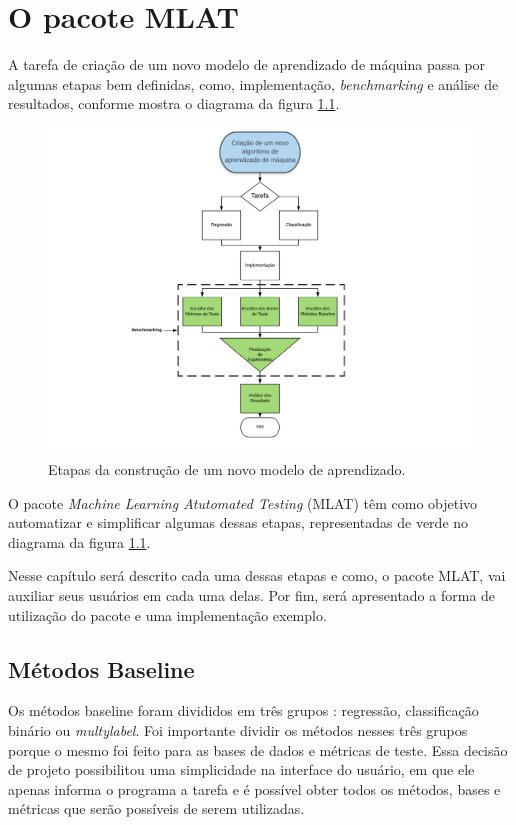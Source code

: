 


\chapter{O pacote MLAT }
\label{chap:TheSoftware}
A tarefa de criação de um novo modelo de aprendizado de máquina passa por algumas etapas bem definidas, como, implementação, \textit{benchmarking} e análise de resultados, conforme mostra o diagrama da figura \ref{fig:BuildingMLModel}.

\begin{figure}[!htb]
	\centering
	\includegraphics[width=\textwidth]{./04-figuras/BuildingNewMethod.png}
	\caption{Etapas da construção de um novo modelo de aprendizado.} 
	\label{fig:BuildingMLModel}
\end{figure}

O pacote \textit{Machine Learning Atutomated Testing} (MLAT) têm como objetivo automatizar e simplificar algumas dessas etapas, representadas de verde no diagrama da figura \ref{fig:BuildingMLModel}. 

Nesse capítulo será descrito cada uma dessas etapas e como, o pacote MLAT, vai auxiliar seus usuários em cada uma delas. Por fim, será apresentado a forma de utilização do pacote e uma implementação exemplo.

\section{Métodos Baseline}
\label{sec:Metodos}
Os métodos baseline foram divididos em três grupos : regressão, classificação binário ou \textit{multylabel}. Foi importante dividir os métodos nesses três grupos porque o mesmo foi feito para as bases de dados e métricas de teste. Essa decisão de projeto possibilitou uma simplicidade na interface do usuário, em que ele apenas informa o programa a tarefa e é possível obter todos os métodos, bases e métricas que serão possíveis de serem utilizadas.


